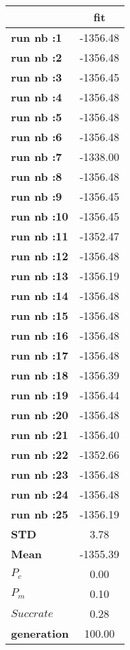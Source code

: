 \begin{tiny}\begin{tabular}{|l|c|}
\hline
&\textbf{fit}\\\hline
\textbf{run nb :1}&-1356.48\\\hline
\textbf{run nb :2}&-1356.48\\\hline
\textbf{run nb :3}&-1356.45\\\hline
\textbf{run nb :4}&-1356.48\\\hline
\textbf{run nb :5}&-1356.48\\\hline
\textbf{run nb :6}&-1356.48\\\hline
\textbf{run nb :7}&-1338.00\\\hline
\textbf{run nb :8}&-1356.48\\\hline
\textbf{run nb :9}&-1356.45\\\hline
\textbf{run nb :10}&-1356.45\\\hline
\textbf{run nb :11}&-1352.47\\\hline
\textbf{run nb :12}&-1356.48\\\hline
\textbf{run nb :13}&-1356.19\\\hline
\textbf{run nb :14}&-1356.48\\\hline
\textbf{run nb :15}&-1356.48\\\hline
\textbf{run nb :16}&-1356.48\\\hline
\textbf{run nb :17}&-1356.48\\\hline
\textbf{run nb :18}&-1356.39\\\hline
\textbf{run nb :19}&-1356.44\\\hline
\textbf{run nb :20}&-1356.48\\\hline
\textbf{run nb :21}&-1356.40\\\hline
\textbf{run nb :22}&-1352.66\\\hline
\textbf{run nb :23}&-1356.48\\\hline
\textbf{run nb :24}&-1356.48\\\hline
\textbf{run nb :25}&-1356.19\\\hline
\textbf{STD}&3.78\\\hline
\textbf{Mean}&-1355.39\\\hline
\textbf{$P_c$}&0.00\\\hline
\textbf{$P_{m}$}&0.10\\\hline
\textbf{$Succ rate$}&0.28\\\hline
\textbf{generation}&100.00\\\hline
\end{tabular}
\end{tiny}